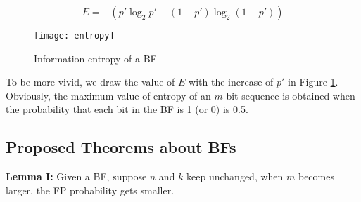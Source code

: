 \begin{equation}
E=-\left(p'\log_2 p' +(1-p')\log_2(1-p')\right)
\label{equ:entropyBF}
\end{equation}


\begin{figure}[htbp]
\centering
\texttt{[image: entropy]}
\caption{Information entropy of a BF} \postsec
\label{fig:entropy}
\end{figure}

To be more vivid, we draw the value of $E$ with the increase of $p'$ in Figure \ref{fig:entropy}. Obviously, the maximum value of entropy of an $m$-bit sequence is obtained when the probability that each bit in the BF is 1 (or 0) is 0.5.



%

\subsection{Proposed Theorems about BFs}
\textbf{Lemma I:} Given a BF, suppose $n$ and $k$ keep unchanged, when $m$ becomes larger, the FP probability gets smaller.


